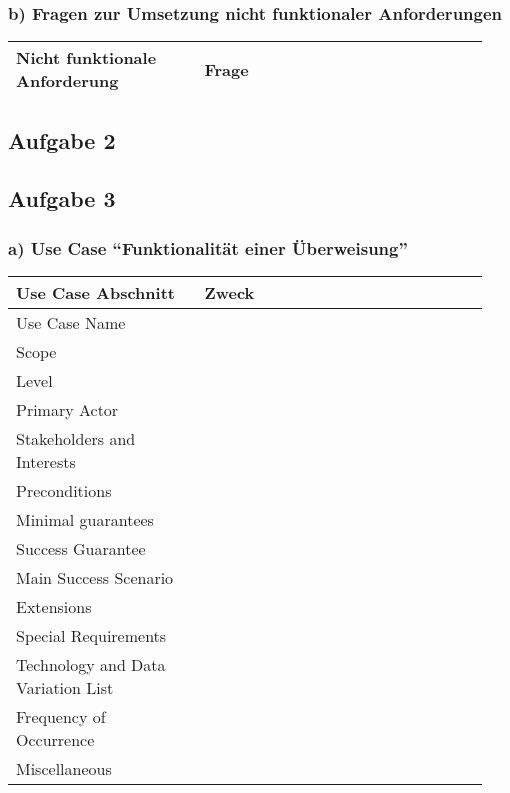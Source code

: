 \documentclass[a4paper,10pt]{article}
\begin{document}
\subsubsection*{b) Fragen zur Umsetzung nicht funktionaler Anforderungen}
\begin{tabular}{|p{0.37\linewidth}|p{0.57\linewidth}|}
\hline
\textbf{Nicht funktionale Anforderung} & \textbf{Frage} \\
\hline

\hline
\end{tabular}

\subsection*{Aufgabe 2}
\subsection*{Aufgabe 3}
\subsubsection*{a) Use Case ``Funktionalität einer Überweisung''}
\begin{tabular}{|p{0.37\linewidth}|p{0.57\linewidth}|}
\hline
\textbf{Use Case Abschnitt} & \textbf{Zweck} \\
\hline
Use Case Name & \\
\hline
Scope & \\
\hline
Level & \\
\hline
Primary Actor & \\
\hline
Stakeholders and Interests & \\
\hline
Preconditions & \\
\hline
Minimal guarantees & \\
\hline
Success Guarantee & \\
\hline
Main Success Scenario & \\
\hline
Extensions & \\
\hline
Special Requirements & \\
\hline
Technology and Data Variation List & \\
\hline
Frequency of Occurrence & \\
\hline
Miscellaneous & \\
\hline
\hline
\end{tabular}
\end{document}
